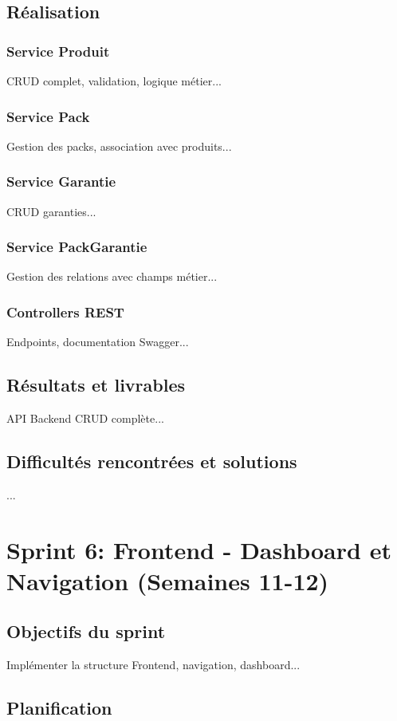 \documentclass[12pt,a4paper]{report}
\begin{document}
\subsection{Réalisation}
\subsubsection{Service Produit}
CRUD complet, validation, logique métier...

\subsubsection{Service Pack}
Gestion des packs, association avec produits...

\subsubsection{Service Garantie}
CRUD garanties...

\subsubsection{Service PackGarantie}
Gestion des relations avec champs métier...

\subsubsection{Controllers REST}
Endpoints, documentation Swagger...

\subsection{Résultats et livrables}
API Backend CRUD complète...

\subsection{Difficultés rencontrées et solutions}
...

\section{Sprint 6: Frontend - Dashboard et Navigation (Semaines 11-12)}
\subsection{Objectifs du sprint}
Implémenter la structure Frontend, navigation, dashboard...

\subsection{Planification}
\end{document}
